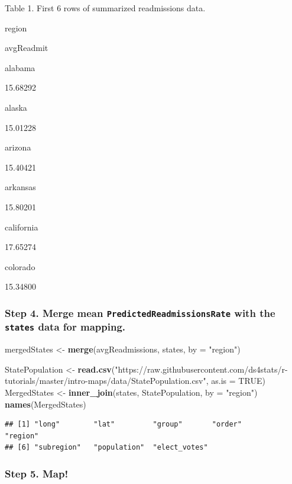 \documentclass[
]{article}
\newenvironment{Shaded}{\begin{snugshade}}{\end{snugshade}}
\newcommand{\AttributeTok}[1]{\textcolor[rgb]{0.13,0.29,0.53}{#1}}
\newcommand{\ConstantTok}[1]{\textcolor[rgb]{0.56,0.35,0.01}{#1}}
\newcommand{\FunctionTok}[1]{\textcolor[rgb]{0.13,0.29,0.53}{\textbf{#1}}}
\newcommand{\NormalTok}[1]{#1}
\newcommand{\OtherTok}[1]{\textcolor[rgb]{0.56,0.35,0.01}{#1}}
\newcommand{\StringTok}[1]{\textcolor[rgb]{0.31,0.60,0.02}{#1}}
\begin{document}
Table 1. First 6 rows of summarized readmissions data.

region

avgReadmit

alabama

15.68292

alaska

15.01228

arizona

15.40421

arkansas

15.80201

california

17.65274

colorado

15.34800

\subsubsection{\texorpdfstring{Step 4. Merge mean
\texttt{PredictedReadmissionsRate} with the \texttt{states} data for
mapping.}{Step 4. Merge mean PredictedReadmissionsRate with the states data for mapping.}}\label{step-4.-merge-mean-predictedreadmissionsrate-with-the-states-data-for-mapping.}

\begin{Shaded}
\begin{Highlighting}[]
\NormalTok{mergedStates }\OtherTok{\textless{}{-}} \FunctionTok{merge}\NormalTok{(avgReadmissions, states, }\AttributeTok{by =} \StringTok{"region"}\NormalTok{)}

\NormalTok{StatePopulation }\OtherTok{\textless{}{-}} \FunctionTok{read.csv}\NormalTok{(}\StringTok{"https://raw.githubusercontent.com/ds4stats/r{-}tutorials/master/intro{-}maps/data/StatePopulation.csv"}\NormalTok{, }\AttributeTok{as.is =} \ConstantTok{TRUE}\NormalTok{)}
\NormalTok{MergedStates }\OtherTok{\textless{}{-}} \FunctionTok{inner\_join}\NormalTok{(states, StatePopulation, }\AttributeTok{by =} \StringTok{"region"}\NormalTok{)}
\FunctionTok{names}\NormalTok{(MergedStates)}
\end{Highlighting}
\end{Shaded}

\begin{verbatim}
## [1] "long"        "lat"         "group"       "order"       "region"     
## [6] "subregion"   "population"  "elect_votes"
\end{verbatim}

\subsubsection{Step 5. Map!}\label{step-5.-map}
\end{document}
